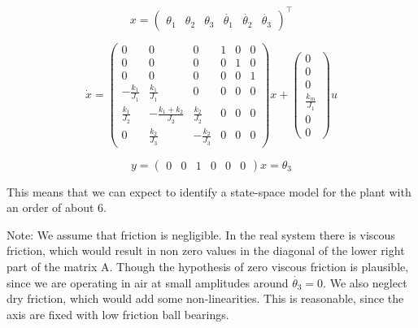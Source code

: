 \documentclass[a4paper,11pt]{article}
\begin{document}
\begin{equation}
x =
\left(\begin{array}{cccccc}\theta_1 &\theta_2 &\theta_3 &\dot{\theta_1} &\dot{\theta_2} &\dot{\theta_3}\end{array}\right)^\intercal
\end{equation}

\begin{equation}
\dot{x} = 
\left(\begin{array}{cccccc} 0 & 0 & 0 & 1 & 0 & 0\\ 0 & 0 & 0 & 0 & 1 & 0\\ 0 & 0 & 0 & 0 & 0 & 1\\ -\frac{k_1}{J_1} & \frac{k_1}{J_1} & 0 & 0 & 0 & 0\\ \frac{k_1}{J_2} & -\frac{k_1 + k_2}{J_2} & \frac{k_2}{J_2} & 0 & 0 & 0\\ 0 & \frac{k_2}{J_3} & -\frac{k_2}{J_3} & 0 & 0 & 0 \end{array}\right)
x
+
\left(\begin{array}{c} 0\\ 0\\ 0\\ \frac{k_m}{J_1}\\ 0\\ 0 \end{array}\right)
u
\end{equation}

\begin{equation}
y =
\left(\begin{array}{cccccc}0&0&1&0&0&0\end{array}\right)
x = \theta_3
\end{equation}

This means that we can expect to identify a state-space model for the plant with an order of about 6.

Note: We assume that friction is negligible. In the real system there is viscous friction, which would result in non zero values in the diagonal of the lower right part of the matrix A. Though the hypothesis of zero viscous friction is plausible, since we are operating in air at small amplitudes around $\dot{\theta_3} = 0$. We also neglect dry friction, which would add some non-linearities. This is reasonable, since the axis are fixed with low friction ball bearings.
\end{document}
